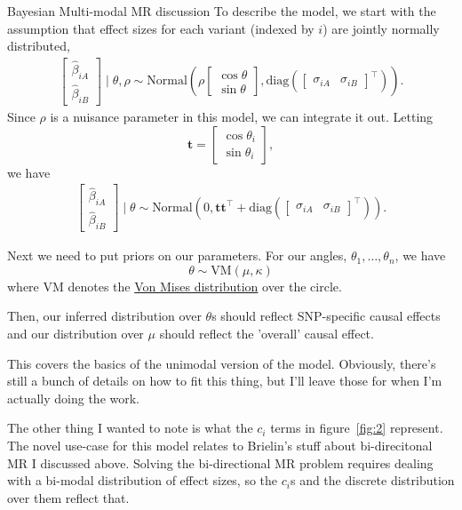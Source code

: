 \begin{Minutes}{Bayesian Multi-modal MR discussion}
To describe the model, we start with the assumption that effect sizes
for each variant (indexed by \( i \)) are jointly normally distributed,
\begin{align*}
    \begin{bmatrix} \hat{\beta}_{iA} \\ \hat{\beta}_{iB} \end{bmatrix} \mid \theta, \rho \sim \text{Normal}\left(\rho \begin{bmatrix} \cos \theta \\ \sin \theta \end{bmatrix}, \text{diag}\left(\begin{bmatrix} \sigma_{iA} & \sigma_{iB} \end{bmatrix}^\top\right)\right).
\end{align*}
Since \( \rho \) is a nuisance parameter in this model, we can integrate it out. Letting \[ \mathbf{t} = \begin{bmatrix}
    \cos \theta_i \\
    \sin \theta_i
\end{bmatrix}, 
\]
we have
\begin{align*}
    \begin{bmatrix} \hat{\beta}_{iA} \\ \hat{\beta}_{iB} \end{bmatrix} \mid \theta \sim \text{Normal}\left(0, \mathbf{t}\mathbf{t}^\top + \text{diag}\left(\begin{bmatrix} \sigma_{iA} & \sigma_{iB} \end{bmatrix}^\top\right)\right).
\end{align*}

Next we need to put priors on our parameters. For our angles, \( \theta_1, \dots, \theta_n \), we have
\[ \theta \sim \text{VM}(\mu, \kappa) \]
where \( \text{VM} \) denotes the \hyperlink{https://en.wikipedia.org/wiki/Von_Mises_distribution}{Von Mises distribution} over the circle.

Then, our inferred distribution over \( \theta \)s should reflect SNP-specific causal effects and
our distribution over \( \mu \) should reflect the 'overall' causal effect.

This covers the basics of the unimodal version of the model. Obviously, there's still a bunch of details on how to fit this thing, but
I'll leave those for when I'm actually doing the work.

The other thing I wanted to note is what the \( c_i \) terms in
figure~\ref{fig:2} represent. The novel use-case for this model relates to
Brielin's stuff about bi-direcitonal MR I discussed above. Solving the
bi-directional MR problem requires dealing with a bi-modal distribution of
effect sizes, so the \( c_i \)s and the discrete distribution over them
reflect that.


\end{Minutes}
